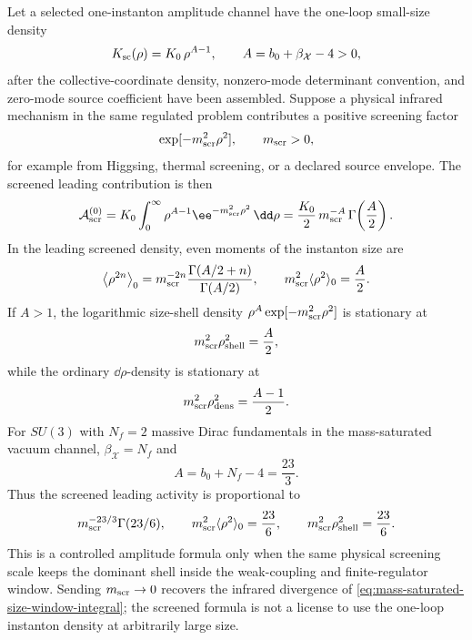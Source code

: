 \begin{proposition}
\label{prop:screened-one-instanton-size-integral}
Let a selected one-instanton amplitude channel have the one-loop small-size
density
\[
  K_{\rm sc}(\rho)
  =
  K_0\,\rho^{A-1},
  \qquad A=b_0+\beta_{\mathcal X}-4>0,
\]
after the collective-coordinate density, nonzero-mode determinant convention,
and zero-mode source coefficient have been assembled.  Suppose a physical
infrared mechanism in the same regulated problem contributes a positive
screening factor
\[
  \exp[-m_{\rm scr}^2\rho^2],
  \qquad m_{\rm scr}>0,
\]
for example from Higgsing, thermal screening, or a declared source envelope.
The screened leading contribution is then
\begin{equation}
  \mathcal A_{\rm scr}^{(0)}
  =
  K_0\int_0^\infty
  \rho^{A-1}\ee^{-m_{\rm scr}^2\rho^2}\,\dd\rho
  =
  \frac{K_0}{2}\,
  m_{\rm scr}^{-A}\,
  \Gamma\!\left(\frac A2\right).
  \label{eq:screened-one-instanton-size-integral}
\end{equation}
In the leading screened density, even moments of the instanton size are
\begin{equation}
  \bigl\langle\rho^{2n}\bigr\rangle_0
  =
  m_{\rm scr}^{-2n}
  \frac{\Gamma(A/2+n)}{\Gamma(A/2)},
  \qquad
  m_{\rm scr}^2\langle\rho^2\rangle_0=\frac A2 .
  \label{eq:screened-one-instanton-size-moments}
\end{equation}
If \(A>1\), the logarithmic size-shell density
\(\rho^{A}\exp[-m_{\rm scr}^2\rho^2]\) is stationary at
\begin{equation}
  m_{\rm scr}^2\rho_{\rm shell}^2=\frac{A}{2},
  \label{eq:screened-one-instanton-log-shell}
\end{equation}
while the ordinary \(\dd\rho\)-density is stationary at
\begin{equation}
  m_{\rm scr}^2\rho_{\rm dens}^2=\frac{A-1}{2}.
  \label{eq:screened-one-instanton-density-saddle}
\end{equation}
For \(SU(3)\) with \(N_f=2\) massive Dirac fundamentals in the mass-saturated
vacuum channel, \(\beta_{\mathcal X}=N_f\) and
\[
  A=b_0+N_f-4=\frac{23}{3}.
\]
Thus the screened leading activity is proportional to
\[
  m_{\rm scr}^{-23/3}\Gamma(23/6),
  \qquad
  m_{\rm scr}^2\langle\rho^2\rangle_0=\frac{23}{6},
  \qquad
  m_{\rm scr}^2\rho_{\rm shell}^2=\frac{23}{6}.
\]
This is a controlled amplitude formula only when the same physical screening
scale keeps the dominant shell inside the weak-coupling and finite-regulator
window.  Sending \(m_{\rm scr}\to0\) recovers the infrared divergence of
\eqref{eq:mass-saturated-size-window-integral}; the screened formula is not a
license to use the one-loop instanton density at arbitrarily large size.
\end{proposition}


